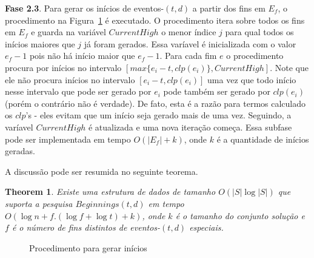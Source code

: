 \documentclass[dissertacao, brazil]{ThesisPUC}
\newtheorem{thm}{Theorem}[section]
\begin{document}
\textbf{Fase 2.3}. Para gerar os inícios de eventos-$(t,d)$ a partir dos fins em $E_f$, o procedimento
na Figura~\ref{fig:beginnings} é executado. O procedimento itera sobre todos os fins em $E_f$ e guarda na variável
$CurrentHigh$ o menor índice $j$ para qual todos os inícios maiores que $j$ já foram gerados. 
Essa varíavel é inicializada com o valor $e_f - 1$ pois não há início maior que $e_f - 1$. Para
cada fim $e$ o procedimento procura por inícios no intervalo $[max\{e_i - t, clp(e_i)\}, CurrentHigh]$.
Note que ele não procura inícios no intervalo $[e_i - t, clp(e_i)]$ uma vez que todo início nesse
intervalo que pode ser gerado por $e_i$ pode também ser gerado por $clp(e_i)$ (porém o contrário
não é verdade). De fato, esta é a razão para termos calculado os $clp$'s - eles evitam que um 
início seja gerado mais de uma vez. Seguindo, a varíavel $CurrentHigh$ é atualizada e uma nova
iteração começa. Essa subfase pode ser implementada em tempo $O(|E_f| + k)$, onde $k$ é a quantidade
de inícios geradas. 

A discussão pode ser resumida no seguinte teorema.

\begin{thm}
Existe uma estrutura de dados de tamanho $O(|S|\log |S|)$ que suporta a pesquisa $Beginnings(t,d)$
em tempo $O(\log n + f.(\log f + \log t) + k)$, onde $k$ é o tamanho do conjunto solução e $f$ 
é o número de fins distintos de eventos-$(t, d)$ especiais. 
\end{thm}


\begin{figure}


\caption{Procedimento para gerar inícios}
\label{fig:beginnings} 
\normalsize

\end{figure}
\end{document}
